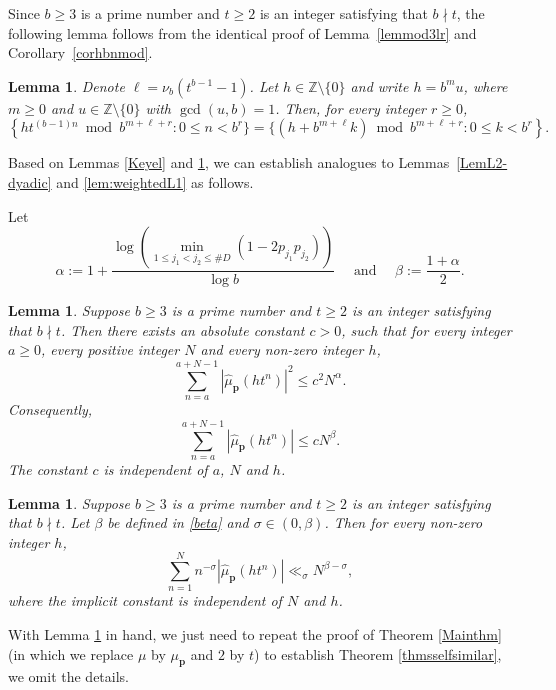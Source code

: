 \documentclass[amssymb,amsfonts,refcheck,12pt,verbatim,righttag]{amsart}
\numberwithin{equation}{section} %
\newtheorem{lem}[thm]{Lemma}
\newcommand{\Z}{\mathbb{Z}}
\theoremstyle{plain}
\begin{document}
Since $b\geq3$ is a prime number and $t\geq2$ is an integer satisfying that $b\nmid t$,   the following lemma follows from the identical proof of Lemma~\ref{lemmod3lr} and Corollary~\ref{corhbnmod}.
\begin{lem}\label{lemodblr}
Denote $\ell=\nu_b(t^{b-1}-1)$. Let $h\in\Z\setminus\{0\}$ and write $
	h=b^m u$, where $m\geq 0$ and $u\in\Z\setminus\{0\}$ with $ \gcd(u,b)=1$. Then, for every integer $r\ge 0$,
\begin{equation*} 
	\left\{ht^{(b-1)n} \bmod b^{m+\ell+r}: 0\leq n<b^r\}
	=
	\{(h+b^{m+\ell}k)\bmod b^{m+\ell+r}: 0\leq k<b^{r}\right\}.
\end{equation*}
\end{lem}

Based on Lemmas \ref{Keyel} and \ref{lemodblr}, we can establish analogues to Lemmas~\ref{LemL2-dyadic} and \ref{lem:weightedL1}  as follows. 


Let
\begin{equation}\label{beta}
\alpha:=1+\frac{\log\left(\min\limits_{1\leq j_{1}<j_{2}\leq\#D}(1-2p_{j_{1}}p_{j_{2}})\right)}{\log b}\quad \text{ and } \quad \beta:=\frac{1+\alpha}{2}. 
\end{equation}

\begin{lem}\label{L2}
Suppose $b\geq3$ is a prime number and $t\geq2$ is an integer satisfying that $b\nmid t$. Then there exists an absolute constant $c>0$, such that for every integer $a\geq0$, every positive integer $N$ and every non-zero integer $h$,
	$$\sum_{n=a}^{a+N-1}|\widehat{\mu}_{\mathbf{p}}(ht^{n})|^{2}\leq c^{2}N^{\alpha}.$$
	Consequently,
	$$\sum_{n=a}^{a+N-1}|\widehat{\mu}_{\mathbf{p}}(ht^{n})|\leq  cN^{\beta}.$$
	The constant $c$ is independent of $a$, $N$ and $h$.
\end{lem}

\begin{lem}\label{Leweightedsum}
	Suppose $b\geq3$ is a prime number and $t\geq2$ is an integer satisfying that $b\nmid t$. Let $\beta$ be defined in \eqref{beta} and 
    $\sigma\in(0,\beta)$. Then for every non-zero integer $h$,
	$$\sum_{n=1}^{N}n^{- \sigma}|\widehat{\mu}_{\mathbf{p}}(ht^{n})|\ll_{\sigma}N^{\beta-\sigma},$$
	where the implicit constant is independent of $N$ and $h$. 
\end{lem}
With Lemma \ref{Leweightedsum} in hand, we just need to repeat the proof of Theorem \ref{Mainthm} (in which we replace $\mu$ by $\mu_{\mathbf{p}}$ and $2$ by $t$) to establish Theorem \ref{thmsselfsimilar}, we omit the details.
 
\end{document}

